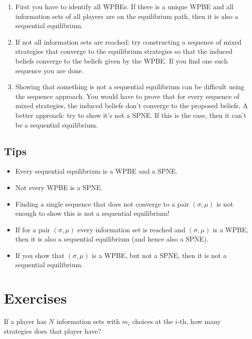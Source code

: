 \documentclass[10pt]{article}
\begin{document}
\begin{spacing}{1.0}
\begin{enumerate}
\item First you have to identify all WPBEs. If there is a unique WPBE and
  all information sets of all players are on the equilibrium path, then it
  is also a sequential equilibrium.
\item If not all information sets are reached: try constructing a sequence
  of mixed strategies that converge to the equilibrium strategies so that
  the induced beliefs converge to the beliefs given by the WPBE. If you
  find one such sequence you are done.
\item Showing that something is not a sequential equilibrium can be
  difficult using the sequence approach. You would have to prove that for
  every sequence of mixed strategies, the induced beliefs don't converge to
  the proposed beliefs. A better approach: try to show it's not a
  SPNE. If this is the case, then it can't be a sequential equilibrium.
\end{enumerate}

\subsection{Tips}

\begin{itemize}
\item Every sequential equilibrium is a WPBE and a SPNE.
\item Not every WPBE is a SPNE.
\item Finding a single sequence that does not converge to a pair $(\sigma,
  \mu)$ is not enough to show this is not a sequential equilibrium!
\item If for a pair $(\sigma, \mu)$ every information set is reached and
  $(\sigma, \mu)$ is a WPBE, then it is also a sequential equilibrium (and
  hence also a SPNE).
\item If you show that $(\sigma, \mu)$ is a WPBE, but not a SPNE, then it
  is not a sequential equilibrium.
\end{itemize}

\newpage
\section{Exercises}

\begin{exercise}
  If a player has $N$ information sets with $m_i$ choices at the $i$-th, how many
  strategies does that player have?
\end{exercise}


\end{spacing}
\end{document}

